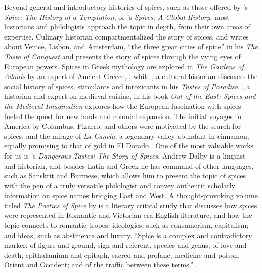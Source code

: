 Beyond general and introductory histories of spices, such as those offered by \textcite{turner_spice_2004}'s \textit{Spice: The History of a Temptation}, or \textcite{czarra_spices_2009}'s \textit{Spices: A Global History}, most historians and philologists approach the topic in depth, from their own areas of expertise. Culinary historian \textcite{krondl_taste_2007} compartmentalized the story of spices, and writes about Venice, Lisbon, and Amsterdam, ``the three great cities of spice'' in his \textit{The Taste of Conquest} and presents the story of spices through the vying eyes of European powers. Spices in Greek mythology are explored in \textit{The Gardens of Adonis} by an expert of Ancient Greece, \textcite{detienne_gardens_1994}, while \textcite{schivelbusch_tastes_1992}, a cultural historian discovers the social history of spices, stimulants and intoxicants in his \textit{Tastes of Paradise}. \textcite{freedman_out_2008}, a historian and expert on medieval cuisine, in his book \textit{Out of the East: Spices and the Medieval Imagination} explores how the European fascination with spices fueled the quest for new lands and colonial expansion. The initial voyages to America by Columbus, Pizarro, and others were motivated by the search for spices, and the mirage of \textit{La Canela}, a legendary valley abundant in cinnamon, equally promising to that of gold in El Dorado \autocite{dalby_christopher_2001}. One of the most valuable works for us is \textcite{dalby_dangerous_2000}'s \textit{Dangerous Tastes: The Story of Spices}. Andrew Dalby is a linguist and historian, and besides Latin and Greek he has command of other languages, such as Sanskrit and Burmese, which allows him to present the topic of spices with the pen of a truly versatile philologist and convey authentic scholarly information on spice names bridging East and West. A thought-provoking volume titled \textit{The Poetics of Spice} by \textcite{morton_poetics_2006} is a literary critical study that discusses how spices were represented in Romantic and Victorian era English literature, and how the topic connects to romantic tropes; ideologies, such as consumerism, capitalism; and ideas, such as abstinence and luxury. ``Spice is a complex and contradictory marker: of figure and ground, sign and referent, species and genus; of love and death, epithalamium and epitaph, sacred and profane, medicine and poison, Orient and Occident; and of the traffic between these terms.'' \autocite[9]{morton_poetics_2006}.

